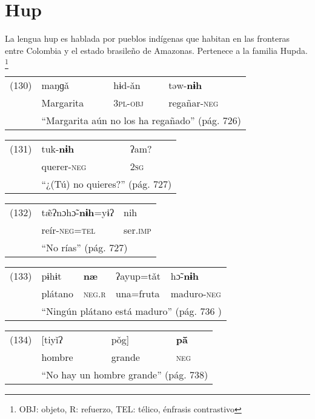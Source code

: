 \section*{Hup}

\noindent La lengua hup es hablada por pueblos indígenas que habitan en las fronteras entre Colombia y el estado brasileño de Amazonas. Pertenece a la familia Hupda.
\footnote{OBJ: objeto, R: refuerzo, TEL: télico, énfrasis contrastivo}
\vspace{0.5cm}

{\setmainfont{Charis SIL} 

\begin{tabular}{llll}
(130) & maŋɡǎ & hɨd-ǎn & təw-\textbf{nɨh} \\
& Margarita & \textsc{3pl-obj} & regañar-\textsc{neg} \\
& \multicolumn{3}{l}{``Margarita aún no los ha regañado'' (pág. 726)}
\end{tabular} \vspace{0.5cm}

\begin{tabular}{lll}
(131) & tuk-\textbf{nɨh} & ʔam? \\
& querer-\textsc{neg} & \textsc{2sg} \\
& \multicolumn{2}{l}{``¿(Tú) no quieres?'' (pág. 727)}
\end{tabular} \vspace{0.5cm}

\begin{tabular}{lll}
(132) & tæ̃ʔnɔhɔ̃-\textbf{nɨh}=yɨʔ & nih \\
& reír-\textsc{neg=tel} & ser.\textsc{imp} \\
& \multicolumn{2}{l}{``No rías'' (pág. 727)}
\end{tabular} \vspace{0.5cm}

\begin{tabular}{lllll}
(133) & pɨhɨt & \textbf{næ} & ʔayup=tǎt & hɔ̃-\textbf{nɨh} \\
& plátano & \textsc{neg.r} & una=fruta & maduro-\textsc{neg} \\
& \multicolumn{4}{l}{``Ningún plátano está maduro'' (pág. 736 )}
\end{tabular} \vspace{0.5cm}

\begin{tabular}{llll}
(134) & [tiyǐʔ & pǒg] & \textbf{pā̌} \\
& hombre & grande & \textsc{neg} \\
& \multicolumn{3}{l}{``No hay un hombre grande'' (pág. 738)}
\end{tabular} \vspace{0.5cm}

}

